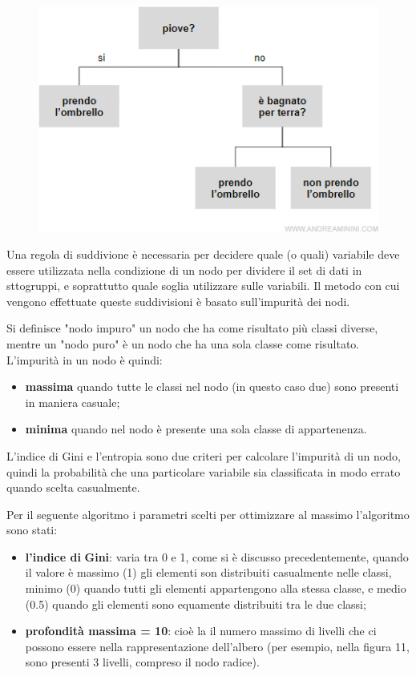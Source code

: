 \documentclass[12pt,a4paper]{article}
\begin{document}
\begin{figure}[h]
    \centering
    \includegraphics[scale=0.4]{decision_tree.png}
    \caption{}
\end{figure}
Una regola di suddivione è necessaria per decidere quale (o quali) variabile deve essere utilizzata nella condizione di un nodo per dividere il set di dati in sttogruppi, e soprattutto quale soglia utilizzare sulle variabili. Il metodo con cui vengono effettuate queste suddivisioni è basato sull'impurità dei nodi.

Si definisce "nodo impuro" un nodo che ha come risultato più classi diverse, mentre un "nodo puro" è un nodo che ha una sola classe come risultato.
L'impurità in un nodo è quindi:
\begin{itemize}
    \item \textbf{massima} quando tutte le classi nel nodo (in questo caso due) sono presenti in maniera casuale;
    \item \textbf{minima} quando nel nodo è presente una sola classe di appartenenza.
\end{itemize}
L'indice di Gini e l'entropia sono due criteri per calcolare l'impurità di un nodo, quindi la probabilità che una particolare variabile sia classificata in modo errato quando scelta casualmente.

Per il seguente algoritmo i parametri scelti per ottimizzare al massimo l'algoritmo sono stati:
\begin{itemize}
    \item \textbf{l'indice di}\textbf{ Gini}: varia tra 0 e 1, come si è discusso precedentemente, quando il valore è massimo (1) gli elementi son distribuiti casualmente nelle classi, minimo (0) quando tutti gli elementi appartengono alla stessa classe, e medio (0.5) quando gli elementi sono equamente distribuiti tra le due classi;
    \item \textbf{profondità massima = 10}: cioè la il numero massimo di livelli che ci possono essere nella rappresentazione dell'albero (per esempio, nella figura 11, sono presenti 3 livelli, compreso il nodo radice).
\end{itemize}
\end{document}
